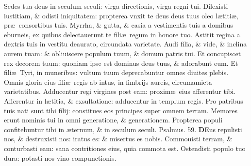 \documentclass[a5paper,10pt]{book}
\def\ae{æ}
\begin{document}
\begin{multicols*}{2}
\newline \color{red} S\color{black}edes tua deus in seculum seculi: virga directionis, virga regni tui.
\newline \color{red} D\color{black}ilexisti iustitiam, \& odisti iniquitatem: propterea vnxit te deus deus tuus oleo l\ae titi\ae , pr\ae \ consortibus tuis.
\newline \color{red} M\color{black}yrrha, \& gutta, \& casia a vestimentis tuis a domibus eburneis, ex quibus delectauerunt te fili\ae \ regum in honore tuo.
\newline \color{red} A\color{black}stitit regina a dextris tuis in vestitu deaurato, circundata varietate.
\newline \color{red} A\color{black}udi filia, \& vide, \& inclina aurem tuam: \& obliuiscere populum tuum, \& domum patris tui.
\newline \color{red} E\color{black}t concupiscet rex decorem tuum: quoniam ipse est dominus deus tuus, \& adorabunt eum.
\newline \color{red} E\color{black}t fili\ae \ Tyri, in muneribus: vultum tuum deprecabuntur omnes diuites plebis.
\newline \color{red} O\color{black}mnis gloria eius fili\ae \ regis ab intus, in fimbrijs aureis, circumamicta varietatibus.
\newline \color{red} A\color{black}dducentur regi virgines post eam: proxim\ae \ eius afferentur tibi.
\newline \color{red} A\color{black}fferentur in l\ae titia, \& exsultatione: adducentur in templum regis.
\newline \color{red} P\color{black}ro patribus tuis nati sunt tibi filij: constitues eos principes super omnem terram.
\newline \color{red} M\color{black}emores erunt nominis tui in omni generatione, \& generationem.
\newline \color{red} P\color{black}ropterea populi confitebuntur tibi in \ae ternum, \& in seculum seculi.
\newline \color{red} Psalmus. 59. \color{black}
\vspace{-.5em}
\lettrine[lines=2]{\bfseries \color{red} D}{}Eus repulisti nos, \& destruxisti nos: iratus es: \& misertus es nobis.
\newline \color{red} C\color{black}ommouisti terram, \& conturbasti eam: sana contritiones eius, quia commota est.
\newline \color{red} O\color{black}stendisti populo tuo dura: potasti nos vino compunctionis.

\end{multicols*}
\end{document}
